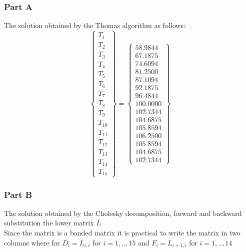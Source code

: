 \documentclass[12pt, a4paper]{article}
\begin{document}
\subsubsection{Part A}
The solution obtained by the Thomas algorithm as follows:
\begin{equation}
\left\{
\begin{array}{c}
T_{1} \\
T_{2} \\
T_{3} \\
T_{4} \\
T_{5} \\
T_{6} \\
T_{7} \\
T_{8} \\
T_{9} \\
T_{10} \\
T_{11} \\
T_{12} \\
T_{13} \\
T_{14} \\
T_{15}
\end{array}
\right\}=
\left\{
\begin{array}{c}
58.9844 \\
67.1875 \\
74.6094 \\
81.2500 \\
87.1094 \\
92.1875 \\
96.4844 \\
100.0000 \\
102.7344 \\
104.6875 \\
105.8594 \\
106.2500 \\
105.8594 \\
104.6875 \\
102.7344
\end{array}
\right\}
\end{equation}

\subsubsection{Part B}
The solution obtained by the Cholesky decomposition, forward and backward substitution the lower matrix $L$\\
Since the matrix is a banded matrix it is practical to write the matrix in two columns where for $D_{i} = L_{i,i}$ for $i = 1,..,15$ and $F_{i} = L_{i+1,i}$ for $i = 1,..,14 $
\end{document}

